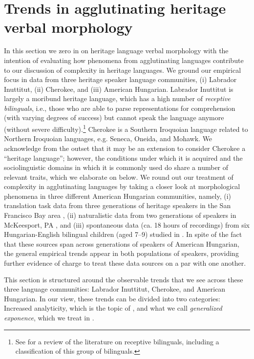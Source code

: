 \documentclass[output=paper,colorlinks,citecolor=brown,footheight=42pt]{langscibook}
\begin{document}
\section{Trends in agglutinating heritage verbal morphology} \label{verbsection}
In this section we zero in on heritage language verbal morphology with the intention of evaluating how phenomena from agglutinating languages contribute to our discussion of complexity in heritage languages. We ground our empirical focus in data from three heritage speaker language communities, (i) Labrador Inuttitut, (ii) Cherokee, and (iii) American Hungarian. Labrador Inuttitut is largely a moribund heritage language, which has a high number of \textit{receptive bilinguals}, i.e., those who are able to parse representations for comprehension (with varying degrees of success) but cannot speak the language anymore (without severe difficulty).\footnote{See \citet{sherkinalieber2020} for a review of the literature on receptive bilinguals, including a classification of this group of bilinguals.} Cherokee is a Southern Iroquoian language related to Northern Iroquoian languages, e.g. Seneca, Oneida, and Mohawk. We acknowledge from the outset that it may be an extension to consider Cherokee a “heritage language”; however, the conditions under which it is acquired and the sociolinguistic domains in which it is commonly used do share a number of relevant traits, which we elaborate on below. We round out our treatment of complexity in agglutinating languages by taking a closer look at morphological phenomena in three different American Hungarian communities, namely, (i) translation task data from three generations of heritage speakers in the San Francisco Bay area \citep{toth2007hungry}, (ii) naturalistic data from two generations of speakers in McKeesport, PA \citep{fenyvesi2000affectedness},  and (iii) spontaneous data (ca. 18 hours of recordings) from six Hungarian-English bilingual children (aged 7--9) studied in \citet{bolonyai2007vulnerable}. In spite of the fact that these sources span across generations of speakers of American Hungarian, the general empirical trends appear in both populations of speakers, providing further evidence of  charge to treat these data sources on a par with one another.

This section is structured around the observable trends that we see across these three language communities: Labrador Inuttitut, Cherokee, and American Hungarian. In our view, these trends can be divided into two categories: Increased analyticity, which is the topic of , and what we call {\itshape generalized exponence}, which we treat in .
\end{document}
